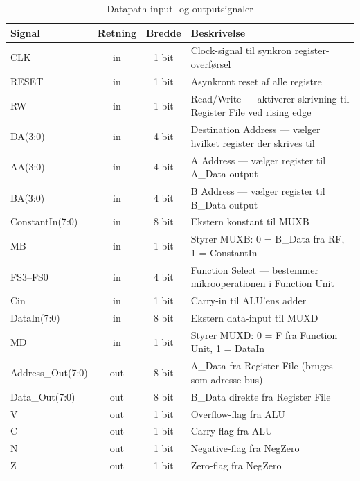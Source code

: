 \documentclass{article}
\begin{document}
\begin{table}[H]
    \centering
    \begin{tabular}{l|c|c|p{7cm}}
        \textbf{Signal} & \textbf{Retning} & \textbf{Bredde} & \textbf{Beskrivelse} \\
        \hline
        CLK        & in  & 1 bit  & Clock-signal til synkron register-overførsel \\
        RESET      & in  & 1 bit  & Asynkront reset af alle registre \\
        RW         & in  & 1 bit  & Read/Write --- aktiverer skrivning til Register File ved rising edge \\
        DA(3:0)    & in  & 4 bit  & Destination Address --- vælger hvilket register der skrives til \\
        AA(3:0)    & in  & 4 bit  & A Address --- vælger register til A\_Data output \\
        BA(3:0)    & in  & 4 bit  & B Address --- vælger register til B\_Data output \\
        ConstantIn(7:0) & in & 8 bit & Ekstern konstant til MUXB \\
        MB         & in  & 1 bit  & Styrer MUXB: 0 = B\_Data fra RF, 1 = ConstantIn \\
        FS3--FS0   & in  & 4 bit  & Function Select --- bestemmer mikrooperationen i Function Unit \\
        Cin        & in  & 1 bit  & Carry-in til ALU'ens adder \\
        DataIn(7:0)& in  & 8 bit  & Ekstern data-input til MUXD \\
        MD         & in  & 1 bit  & Styrer MUXD: 0 = F fra Function Unit, 1 = DataIn \\
        \hline
        Address\_Out(7:0) & out & 8 bit & A\_Data fra Register File (bruges som adresse-bus) \\
        Data\_Out(7:0)    & out & 8 bit & B\_Data direkte fra Register File \\
        V          & out & 1 bit  & Overflow-flag fra ALU \\
        C          & out & 1 bit  & Carry-flag fra ALU \\
        N          & out & 1 bit  & Negative-flag fra NegZero \\
        Z          & out & 1 bit  & Zero-flag fra NegZero \\
    \end{tabular}
    \caption{Datapath input- og outputsignaler}
    \label{tab:datapath-signals}
\end{table}
\end{document}
